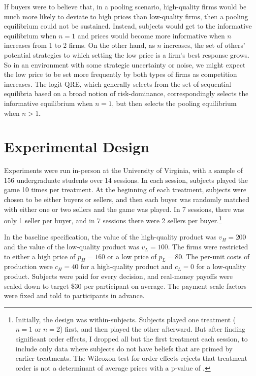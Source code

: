 \documentclass[12pt]{article}
\begin{document}
If buyers were to believe that, in a pooling scenario, high-quality firms would be much more likely to deviate to high prices than low-quality firms, then a pooling equilibrium could not be sustained. Instead, subjects would get to the informative equilibrium when $n = 1$ and prices would become more informative when $n$ increases from 1 to 2 firms. On the other hand, as $n$ increases, the set of others' potential strategies to which setting the low price is a firm's best response grows. So in an environment with some strategic uncertainty or noise, we might expect the low price to be set more frequently by both types of firms as competition increases. The logit QRE, which generally selects from the set of sequential equilibria based on a broad notion of risk-dominance, correspondingly selects the informative equilibrium when $n = 1$, but then selects the pooling equilibrium when $n > 1$.




\section{Experimental Design}

Experiments were run in-person at the University of Virginia, with a sample of 156 undergraduate students over 14 sessions. In each session, subjects played the game 10 times per treatment. At the beginning of each treatment, subjects were chosen to be either buyers or sellers, and then each buyer was randomly matched with either one or two sellers and the game was played. In 7 sessions, there was only 1 seller per buyer, and in 7 sessions there were 2 sellers per buyer.\footnote{Initially, the design was within-subjects. Subjects played one treatment ($n=1$ or $n=2$) first, and then played the other afterward. But after finding significant order effects, I dropped all but the first treatment each session, to include only data where subjects do not have beliefs that are primed by earlier treatments. The Wilcoxon test for order effects rejects that treatment order is not a determinant of average prices with a p-value of \wilcoxonpvalue.}

In the baseline specification, the value of the high-quality product was $v_H = 200$ and the value of the low-quality product was $v_L = 100$. The firms were restricted to either a high price of $p_H = 160$ or a low price of $p_L = 80$. The per-unit costs of production were $c_H = 40$ for a high-quality product and $c_L = 0$ for a low-quality product. Subjects were paid for every decision, and real-money payoffs were scaled down to target \$30 per participant on average. The payment scale factors were fixed and told to participants in advance.
\end{document}

